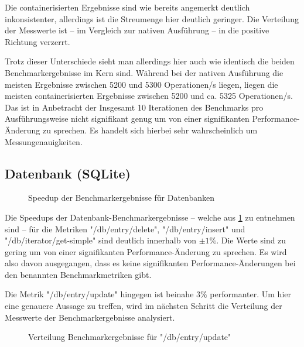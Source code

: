 Die containerisierten Ergebnisse sind wie bereits angemerkt deutlich inkonsistenter, allerdings ist die Streumenge hier deutlich geringer. Die Verteilung der Messwerte ist – im Vergleich zur nativen Ausführung – in die positive Richtung verzerrt.  

Trotz dieser Unterschiede sieht man allerdings hier auch wie identisch die beiden Benchmarkergebnisse im Kern sind. Während bei der nativen Ausführung die meisten Ergebnisse zwischen 5200 und 5300 Operationen/s liegen, liegen die meisten containerisierten Ergebnisse zwischen 5200 und ca. 5325 Operationen/s. Das ist in Anbetracht der Insgesamt 10 Iterationen des Benchmarks pro Ausführungsweise nicht signifikant genug um von einer signifikanten Performance-Änderung zu sprechen. Es handelt sich hierbei sehr wahrscheinlich um Messungenauigkeiten. 


\subsection{Datenbank (SQLite)}

\begin{figure}[H]
    \centering
    
    \caption{Speedup der Benchmarkergebnisse für Datenbanken}
    \label{fig:speedup_db}
\end{figure}

\FloatBarrier

Die Speedups der Datenbank-Benchmarkergebnisse – welche aus \cref{fig:speedup_db} zu entnehmen sind – für die Metriken "/db/entry/delete", "/db/entry/insert" und "/db/iterator/get-simple" sind deutlich innerhalb von $\pm 1\%$. Die Werte sind zu gering um von einer signifikanten Performance-Änderung zu sprechen. Es wird also davon ausgegangen, dass es keine signifikanten Performance-Änderungen bei den benannten Benchmarkmetriken gibt.

Die Metrik "/db/entry/update" hingegen ist beinahe $3\%$ performanter. Um hier eine genauere Aussage zu treffen, wird im nächsten Schritt die Verteilung der Messwerte der Benchmarkergebnisse analysiert.

\begin{figure}[H]
    \centering
    
    \caption{Verteilung Benchmarkergebnisse für "/db/entry/update"}
    \label{fig:mdist_db_entry_update}
\end{figure}

